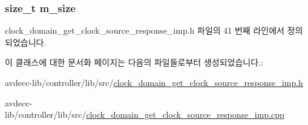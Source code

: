 \subsubsection[{\texorpdfstring{m\+\_\+size}{m_size}}]{\setlength{\rightskip}{0pt plus 5cm}size\+\_\+t m\+\_\+size\hspace{0.3cm}{\ttfamily [private]}}\hypertarget{classavdecc__lib_1_1clock__domain__get__clock__source__response__imp_a0dc3c363255f193681c77b4d2a82e995}{}\label{classavdecc__lib_1_1clock__domain__get__clock__source__response__imp_a0dc3c363255f193681c77b4d2a82e995}


clock\+\_\+domain\+\_\+get\+\_\+clock\+\_\+source\+\_\+response\+\_\+imp.\+h 파일의 41 번째 라인에서 정의되었습니다.



이 클래스에 대한 문서화 페이지는 다음의 파일들로부터 생성되었습니다.\+:\begin{DoxyCompactItemize}
\item 
avdecc-\/lib/controller/lib/src/\hyperlink{clock__domain__get__clock__source__response__imp_8h}{clock\+\_\+domain\+\_\+get\+\_\+clock\+\_\+source\+\_\+response\+\_\+imp.\+h}\item 
avdecc-\/lib/controller/lib/src/\hyperlink{clock__domain__get__clock__source__response__imp_8cpp}{clock\+\_\+domain\+\_\+get\+\_\+clock\+\_\+source\+\_\+response\+\_\+imp.\+cpp}\end{DoxyCompactItemize}
